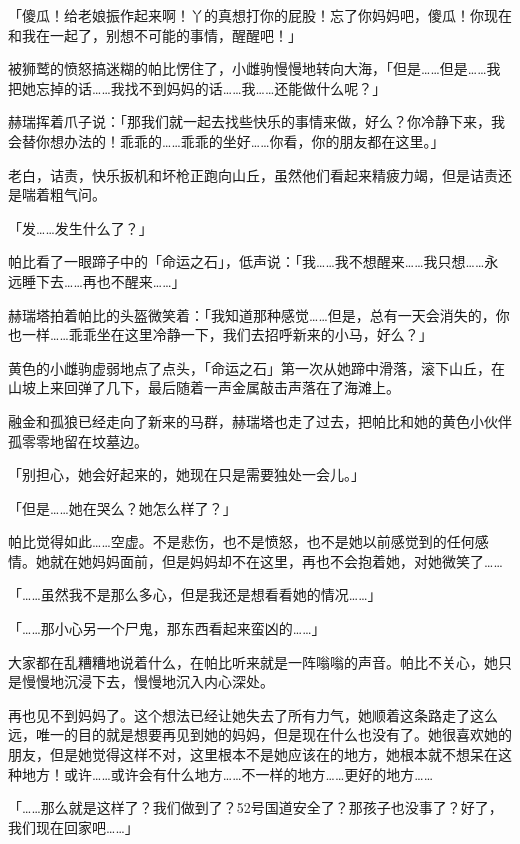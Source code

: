 「傻瓜！给老娘振作起来啊！丫的真想打你的屁股！忘了你妈妈吧，傻瓜！你现在和我在一起了，别想不可能的事情，醒醒吧！」

被狮鹫的愤怒搞迷糊的帕比愣住了，小雌驹慢慢地转向大海，「但是……但是……我把她忘掉的话……我找不到妈妈的话……我……还能做什么呢？」

赫瑞挥着爪子说：「那我们就一起去找些快乐的事情来做，好么？你冷静下来，我会替你想办法的！乖乖的……乖乖的坐好……你看，你的朋友都在这里。」

老白，诘责，快乐扳机和坏枪正跑向山丘，虽然他们看起来精疲力竭，但是诘责还是喘着粗气问。

「发……发生什么了？」

帕比看了一眼蹄子中的「命运之石」，低声说：「我……我不想醒来……我只想……永远睡下去……再也不醒来……」

赫瑞塔拍着帕比的头盔微笑着：「我知道那种感觉……但是，总有一天会消失的，你也一样……乖乖坐在这里冷静一下，我们去招呼新来的小马，好么？」

黄色的小雌驹虚弱地点了点头，「命运之石」第一次从她蹄中滑落，滚下山丘，在山坡上来回弹了几下，最后随着一声金属敲击声落在了海滩上。

\horizonline


融金和孤狼已经走向了新来的马群，赫瑞塔也走了过去，把帕比和她的黄色小伙伴孤零零地留在坟墓边。

「别担心，她会好起来的，她现在只是需要独处一会儿。」

「但是……她在哭么？她怎么样了？」

帕比觉得如此……空虚。不是悲伤，也不是愤怒，也不是她以前感觉到的任何感情。她就在她妈妈面前，但是妈妈却不在这里，再也不会抱着她，对她微笑了……{}

「……虽然我不是那么多心，但是我还是想看看她的情况……」

「……那小心另一个尸鬼，那东西看起来蛮凶的……」

大家都在乱糟糟地说着什么，在帕比听来就是一阵嗡嗡的声音。帕比不关心，她只是慢慢地沉浸下去，慢慢地沉入内心深处。

再也见不到妈妈了。这个想法已经让她失去了所有力气，她顺着这条路走了这么远，唯一的目的就是想要再见到她的妈妈，但是现在什么也没有了。她很喜欢她的朋友，但是她觉得这样不对，这里根本不是她应该在的地方，她根本就不想呆在这种地方！或许……或许会有什么地方……不一样的地方……更好的地方……{}

「……那么就是这样了？我们做到了？52号国道安全了？那孩子也没事了？好了，我们现在回家吧……」


